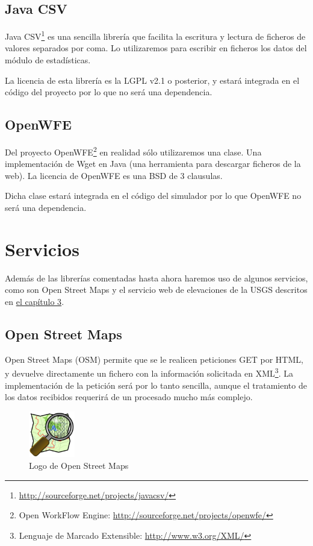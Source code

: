 \subsection*{Java CSV}

Java CSV\footnote{\url{http://sourceforge.net/projects/javacsv/}} es una
sencilla librería que facilita la escritura y lectura de ficheros de valores
separados por coma. Lo utilizaremos para escribir en ficheros los datos del
módulo de estadísticas.

La licencia de esta librería es la LGPL v2.1 o posterior, y estará integrada en
el código del proyecto por lo que no será una dependencia.

\subsection*{OpenWFE}

Del proyecto OpenWFE\footnote{Open WorkFlow Engine:
\url{http://sourceforge.net/projects/openwfe/}} en realidad sólo utilizaremos
una clase. Una implementación de Wget en Java (una herramienta para descargar
ficheros de la web). La licencia de OpenWFE es una BSD de 3 clausulas.

Dicha clase estará integrada en el código del simulador por lo que OpenWFE no
será una dependencia.

\section*{Servicios}

Además de las librerías comentadas hasta ahora haremos uso de algunos
servicios, como son Open Street Maps y el servicio web de elevaciones de la
USGS descritos en \hyperref[cap3]{el capítulo 3}.

\subsection*{Open Street Maps}

Open Street Maps (OSM)\cite{Pinto09} permite que se le realicen peticiones GET
por HTML, y
devuelve directamente un fichero con la información solicitada en
XML\footnote{Lenguaje de Marcado Extensible: \url{http://www.w3.org/XML/}}. La
implementación de la petición será por lo tanto sencilla, aunque el tratamiento
de los datos recibidos requerirá de un procesado mucho más complejo.

\begin{figure}[H]
 \centering
 \includegraphics[width=20mm]{figuras/cap4/osm.png}
 \caption{Logo de Open Street Maps}
\end{figure}

